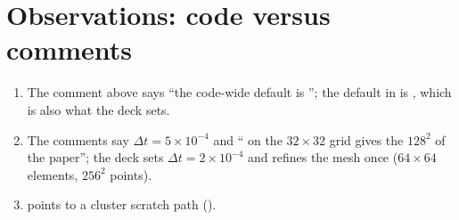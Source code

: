 \documentclass[10pt]{article}
\begin{document}
\section{Observations: code versus comments}
\begin{enumerate}[leftmargin=*]
\item The comment above  says ``the code-wide default is ''; the default in
 is , which is also what the deck sets.
\item The comments say $\Delta t=5\times10^{-4}$ and `` on the $32\times32$ grid gives the
$128^2$ of the paper''; the deck sets $\Delta t=2\times10^{-4}$ and refines the mesh once
($64\times64$ elements, $256^2$ points).
\item {} points to a cluster scratch path ().
\end{enumerate}


\end{document}
